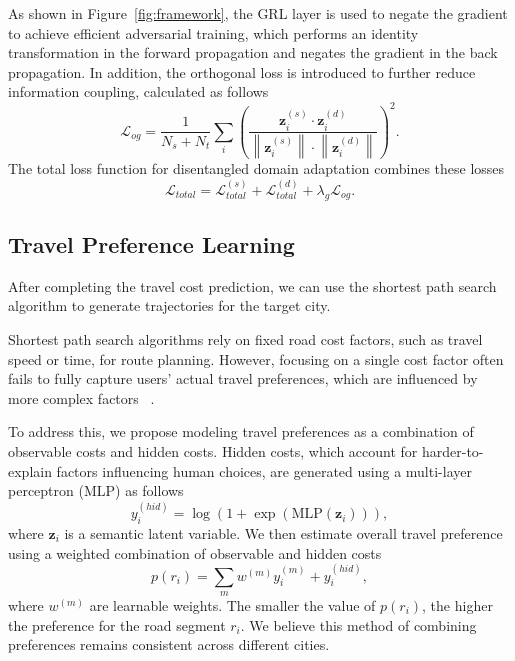 As shown in Figure~\ref{fig:framework}, the GRL layer is used to negate the gradient to achieve efficient adversarial training, which performs an identity transformation in the forward propagation and negates the gradient in the back propagation.
In addition, the orthogonal loss is introduced to further reduce information coupling, calculated as follows
\begin{equation}
\mathcal{L}_{og} = \frac{1}{N_s + N_t}\sum_i \left( \frac{\bm{z}_i^{(s)} \cdot \bm{z}_i^{(d)}}{ \left\| \bm{z}_i^{(s)} \right\| \cdot \left\| \bm{z}_i^{(d)} \right\| } \right)^2.
\end{equation}
The total loss function for disentangled domain adaptation combines these losses
\begin{equation}
\mathcal{L}_{total} = \mathcal{L}_{total}^{(s)} + \mathcal{L}_{total}^{(d)} + \lambda_g \mathcal{L}_{og}.
\end{equation}
\subsection{Travel Preference Learning}

After completing the travel cost prediction, we can use the shortest path search algorithm to generate trajectories for the target city.

Shortest path search algorithms rely on fixed road cost factors, such as travel speed or time, for route planning. However, focusing on a single cost factor often fails to fully capture users’ actual travel preferences, which are influenced by more complex factors ~\cite{rideshare_chen2018price}. 

To address this, we propose modeling travel preferences as a combination of observable costs and hidden costs. Hidden costs, which account for harder-to-explain factors influencing human choices, are generated using a multi-layer perceptron (MLP) as follows
\begin{equation}
y_i^{(hid)} = \log \left( 1 + \exp \left( \text{MLP} (\bm{z}_i) \right) \right),
\end{equation}
where \(\bm{z}_i\) is a semantic latent variable.
We then estimate overall travel preference using a weighted combination of observable and hidden costs
\begin{equation}
\label{equ:combined_cost}
p(r_i) = \sum_{m} w^{(m)} y_i^{(m)} + y_i^{(hid)},
\end{equation}
where \(w^{(m)}\) are learnable weights. The smaller the value of \(p(r_i)\), the higher the preference for the road segment \(r_i\). We believe this method of combining preferences remains consistent across different cities.


